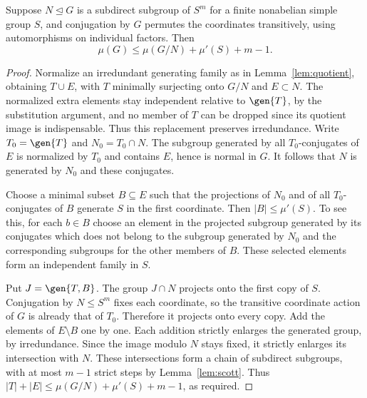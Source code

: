\begin{lemma}\label{lem:simplekernel}
Suppose $N\unlhd G$ is a subdirect subgroup of $S^m$ for a finite
nonabelian simple group $S$, and conjugation by $G$ permutes the
coordinates transitively, using automorphisms on individual factors.
Then
\begin{equation}\label{eq:simplekernel}
 \mu(G)\leq\mu(G/N)+\mu'(S)+m-1.                    \end{equation}
\end{lemma}
\begin{proof}
Normalize an irredundant generating family as in
Lemma~\ref{lem:quotient}, obtaining $T\cup E$, with $T$ minimally
surjecting onto $G/N$ and $E\subset N$. The normalized extra elements stay independent relative to $\gen{T}$,
by the substitution argument, and no member of $T$ can be dropped since
its quotient image is indispensable. Thus this replacement preserves
irredundance. Write $T_0=\gen{T}$ and $N_0=T_0\cap N$.
The subgroup generated by all $T_0$-conjugates of $E$ is normalized by
$T_0$ and contains $E$, hence is normal in $G$. It follows that
$N$ is generated by $N_0$ and these conjugates.

Choose a minimal subset $B\subseteq E$ such that the projections of
$N_0$ and of all $T_0$-conjugates of $B$ generate $S$ in the first
coordinate. Then $|B|\leq\mu'(S)$. To see this, for each $b\in B$
choose an element in the projected subgroup generated by its conjugates
which does not belong to the subgroup generated by $N_0$ and the
corresponding subgroups for the other members of $B$. These selected
elements form an independent family in $S$.

Put $J=\gen{T,B}$. The group $J\cap N$ projects onto the first copy
of $S$. Conjugation by $N\leq S^m$ fixes each coordinate, so the transitive
coordinate action of $G$ is already that of $T_0$. Therefore
it projects onto every copy. Add the elements of $E\setminus B$
one by one. Each addition strictly enlarges the generated group, by
irredundance. Since the image modulo $N$ stays fixed, it strictly
enlarges its intersection with $N$. These intersections form a chain
of subdirect subgroups, with at most $m-1$ strict steps by
Lemma~\ref{lem:scott}. Thus
$|T|+|E|\leq\mu(G/N)+\mu'(S)+m-1$, as required.
\end{proof}

